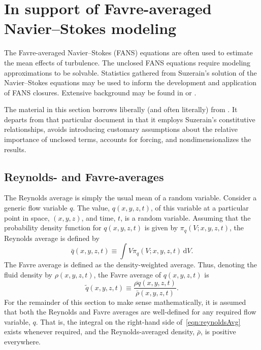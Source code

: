 \documentclass[letterpaper,11pt,nointlimits,reqno,draft]{amsbook}
\begin{document}
\chapter{In support of Favre-averaged Navier--Stokes modeling}
\label{sec:supportFANS}

The Favre-averaged Navier--Stokes (FANS) equations are often used to estimate
the mean effects of turbulence.  The unclosed FANS equations require modeling
approximations to be solvable.  Statistics gathered from Suzerain's solution of
the Navier--Stokes equations may be used to inform the development and
application of FANS closures.  Extensive background may be found in
\citet{Chassaing2010} or \citet{SmitsDussauge2005}.

The material in this section borrows liberally (and often literally) from
\citet{OliverFANSModels2011}.  It departs from that particular document in that
it employs Suzerain's constitutive relationships, avoids introducing customary
assumptions about the relative importance of unclosed terms, accounts for
forcing, and nondimensionalizes the results.

\section{Reynolds- and Favre-averages}
\label{sec:averaging}

The Reynolds average is simply the usual mean of a random variable.  Consider a
generic flow variable $q$.  The value, $q(x, y, z, t)$, of this variable at a
particular point in space, $(x, y, z)$, and time, $t$, is a random variable.
Assuming that the probability density function for $q(x, y, z, t)$ is given by
$\pi_q(V; x, y, z, t)$, the Reynolds average is defined by
%
\begin{equation}
\label{eqn:reynoldsAvg}
\bar{q}(x, y, z, t) \equiv \int V \pi_q(V; x, y, z, t) \,\mathrm{d} V.
\end{equation}
%
The Favre average is defined as the density-weighted average.  Thus,
denoting the fluid density by $\rho(x,y,z, t)$, the Favre average of
$q(x,y,z, t)$ is
%
\begin{equation*}
\tilde{q}(x,y,z, t) \equiv \frac{ \overline{\rho q}(x,y,z, t) }{ \bar{\rho}(x,y,z, t) }.
\end{equation*}
%
For the remainder of this section to make sense mathematically, it is
assumed that both the Reynolds and Favre averages are well-defined for
any required flow variable, $q$.  That is, the integral on the
right-hand side of~\eqref{eqn:reynoldsAvg} exists whenever required,
and the Reynolds-averaged density, $\bar{\rho}$, is positive
everywhere.
\end{document}
